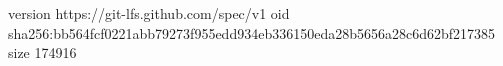 version https://git-lfs.github.com/spec/v1
oid sha256:bb564fcf0221abb79273f955edd934eb336150eda28b5656a28c6d62bf217385
size 174916
